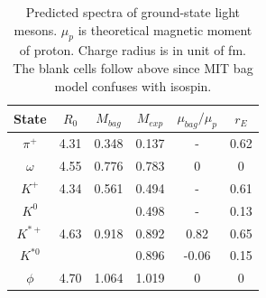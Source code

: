 \documentclass[prd,twocolumn,floatfix,nofootinbib]{revtex4}
\begin{document}
\renewcommand{\tabcolsep}{0.37cm}
\renewcommand{\arraystretch}{1.3}
\begin{table}[!htbp]
    \caption{Predicted spectra of ground-state light mesons. $\mu_{p}$ is theoretical magnetic moment of proton. Charge radius is in unit of fm.
    The blank cells follow above since MIT bag model confuses with isospin.}
    \label{tab:lightmeson}
    \begin{tabular}{cccccc}
        \hline\hline
        {\rm State}         &$R_{0}$    &$M_{bag}$  &$M_{exp}$  &$\mu_{bag}/\mu_{p}$    &$r_{E}$ \\ \hline
        $\pi^{+}$ 	        &4.31	    &0.348	    &0.137	    &-	                    &0.62 \\
        $\omega$ 	        &4.55	    &0.776	    &0.783	    &0                      &0 \\
        $K^{+}$ 	        &4.34	    &0.561	    &0.494	    &-                      &0.61 \\
        $K^{0}$ 		    &           &           &0.498	    &-	                    &0.13 \\
        $K^{\ast +}$ 	    &4.63	    &0.918	    &0.892	    &0.82                   &0.65 \\
        $K^{\ast 0}$ 	    &           &           &0.896	    &-0.06	                &0.15 \\
        $\phi$ 	            &4.70	    &1.064	    &1.019	    &0                      &0 \\
        \hline\hline
    \end{tabular}
\end{table}
\end{document}
